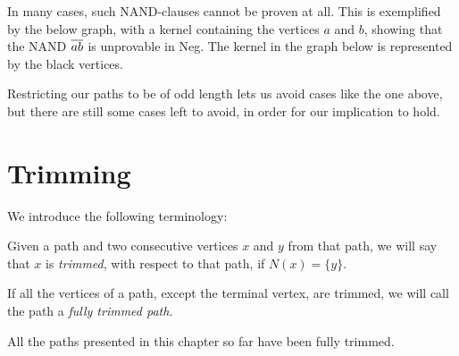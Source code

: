 In many cases, such NAND-clauses cannot be proven at all.
This is exemplified by the below graph, with a kernel containing the vertices $a$ and $b$, showing that the NAND $\ol{ab}$ is unprovable in Neg.
The kernel in the graph below is represented by the black vertices.\par
\begin{figure}[!h]
  \centering
  \caption{}
  \label{fig:kernel_even}
\end{figure}
Restricting our paths to be of odd length lets us avoid cases like the one above, but there are still some cases left to avoid, in order for our implication to hold.
\section{Trimming}
\label{sec:Trimming}
We introduce the following terminology:
\begin{definition}
  Given a path and two consecutive vertices $x$ and $y$ from that path, we will say that $x$ is \textit{trimmed}, with respect to that path, if $N(x) = \{y\}$.
\end{definition}
\begin{definition}
  If all the vertices of a path, except the terminal vertex, are trimmed, we will call the path a \textit{fully trimmed path}.
\end{definition}
All the paths presented in this chapter so far have been fully trimmed.

